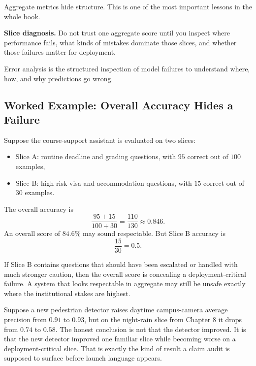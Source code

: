 Aggregate metrics hide structure. This is one of the most important lessons in the whole book.

\begin{thinkingtool}
\textbf{Slice diagnosis.} Do not trust one aggregate score until you inspect where performance fails, what kinds of mistakes dominate those slices, and whether those failures matter for deployment.
\end{thinkingtool}

\begin{definition}
Error analysis is the structured inspection of model failures to understand where, how, and why predictions go wrong.
\end{definition}

\subsection{Worked Example: Overall Accuracy Hides a Failure}

Suppose the course-support assistant is evaluated on two slices:
\begin{itemize}[leftmargin=*]
\item Slice A: routine deadline and grading questions, with $95$ correct out of $100$ examples,
\item Slice B: high-risk visa and accommodation questions, with $15$ correct out of $30$ examples.
\end{itemize}
The overall accuracy is
\[
\frac{95 + 15}{100 + 30} = \frac{110}{130} \approx 0.846.
\]
An overall score of $84.6\%$ may sound respectable. But Slice B accuracy is
\[
\frac{15}{30} = 0.5.
\]

If Slice B contains questions that should have been escalated or handled with much stronger caution, then the overall score is concealing a deployment-critical failure. A system that looks respectable in aggregate may still be unsafe exactly where the institutional stakes are highest.

\begin{example}
Suppose a new pedestrian detector raises daytime campus-camera average precision from $0.91$ to $0.93$, but on the night-rain slice from Chapter 8 it drops from $0.74$ to $0.58$. The honest conclusion is not that the detector improved. It is that the new detector improved one familiar slice while becoming worse on a deployment-critical slice. That is exactly the kind of result a claim audit is supposed to surface before launch language appears.
\end{example}

